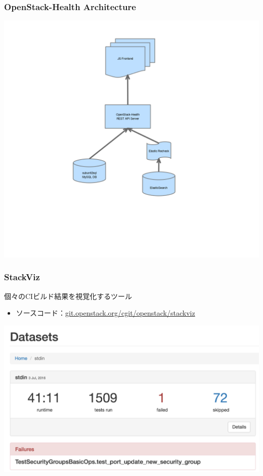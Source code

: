 \documentclass[aspectratio=169,11pt,hyperref={colorlinks=true}]{beamer}
\begin{document}
\begin{frame}
  \frametitle{OpenStack-Health Architecture}
  \begin{center}
    \includegraphics[height=1.2\textheight]{openstack-health-arch.png}
  \end{center}
\end{frame}

\begin{frame}
  \frametitle{StackViz}
  個々のCIビルド結果を視覚化するツール
  \begin{itemize}
    \item ソースコード：\href{http://git.openstack.org/cgit/openstack/stackviz}{git.openstack.org/cgit/openstack/stackviz}
  \end{itemize}
  \begin{center}
    \includegraphics[width=1.3\textheight]{stackviz-sample-top.png}
  \end{center}
\end{frame}
\end{document}
